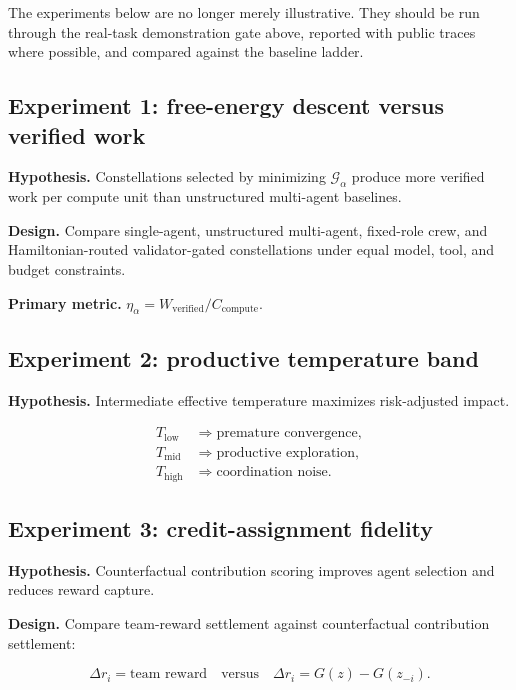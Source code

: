 The experiments below are no longer merely illustrative. They should be
run through the real-task demonstration gate above, reported with public
traces where possible, and compared against the baseline ladder.

\subsection{Experiment 1: free-energy descent versus verified
work}\label{experiment-1-free-energy-descent-versus-verified-work}

\textbf{Hypothesis.} Constellations selected by minimizing
\(\mathcal{G}_{\alpha}\) produce more verified work per compute unit
than unstructured multi-agent baselines.

\textbf{Design.} Compare single-agent, unstructured multi-agent,
fixed-role crew, and Hamiltonian-routed validator-gated constellations
under equal model, tool, and budget constraints.

\textbf{Primary metric.}
\(\eta_{\alpha}=W_{\mathrm{verified}}/C_{\mathrm{compute}}\).

\subsection{Experiment 2: productive temperature
band}\label{experiment-2-productive-temperature-band}

\textbf{Hypothesis.} Intermediate effective temperature maximizes
risk-adjusted impact.

\[
\begin{aligned}
T_{\mathrm{low}}&\Rightarrow\text{premature convergence},\\
T_{\mathrm{mid}}&\Rightarrow\text{productive exploration},\\
T_{\mathrm{high}}&\Rightarrow\text{coordination noise}.
\end{aligned}
\]

\subsection{Experiment 3: credit-assignment
fidelity}\label{experiment-3-credit-assignment-fidelity}

\textbf{Hypothesis.} Counterfactual contribution scoring improves agent
selection and reduces reward capture.

\textbf{Design.} Compare team-reward settlement against counterfactual
contribution settlement:

\[
\Delta r_i=\text{team reward}
\quad\text{versus}\quad
\Delta r_i=G(z)-G(z_{-i}).
\]

